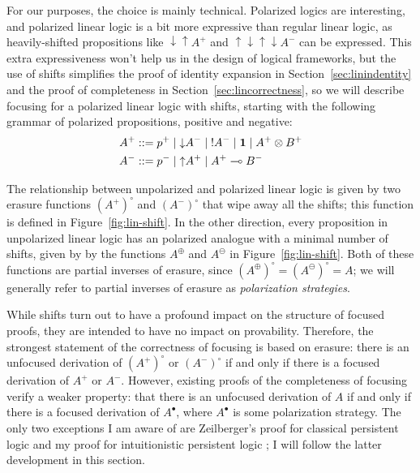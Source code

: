 For our purposes, the choice is mainly technical.  Polarized logics
are interesting, and polarized linear logic is a bit more expressive
than regular linear logic, as heavily-shifted propositions like
${\downarrow}{\uparrow}A^+$ and
${\uparrow}{\downarrow}{\uparrow}{\downarrow}A^-$ can be
expressed. This extra expressiveness won't help us in the design of
logical frameworks, but the use of shifts simplifies the proof of
identity expansion in Section~\ref{sec:linindentity} and the proof of
completeness in Section~\ref{sec:lincorrectness}, so we will describe
focusing for a polarized linear logic with shifts, starting with the 
following grammar of polarized propositions, positive and negative:
\begin{align*}
A^+ & ::= p^+ \mid {\downarrow}A^- \mid {!}A^- \mid \mathbf{1} \mid A^+ \otimes B^+\\
A^- & ::= p^- \mid {\uparrow}A^+ \mid A^+ \multimap B^-
\end{align*}



The relationship between unpolarized and polarized linear logic is
given by two erasure functions $(A^+)^\circ$ and $(A^-)^\circ$ that
wipe away all the shifts; this function is defined in
Figure~\ref{fig:lin-shift}. In the other direction, every 
proposition in unpolarized linear logic has an polarized
analogue with a minimal number of shifts, given by by
the functions $A^\oplus$ and $A^\ominus$ in Figure~\ref{fig:lin-shift}.
Both of these functions are partial inverses of erasure, since
$(A^\oplus)^\circ = (A^\ominus)^\circ = A$; we will generally refer
to partial inverses of erasure as {\it polarization strategies}. 

While shifts turn out to have a profound impact on the structure of
focused proofs, they are intended to have no impact on
provability. Therefore, the strongest statement of the correctness of
focusing is based on erasure: there is an unfocused derivation of
$(A^+)^\circ$ or $(A^-)^\circ$ if and only if there is a focused
derivation of $A^+$ or $A^-$.  However, existing proofs of the
completeness of focusing verify 
a weaker property: that there is an unfocused
derivation of $A$ if and only if there is a focused derivation of
$A^\bullet$, where $A^\bullet$ is some polarization strategy.  The
only two exceptions I am aware of are Zeilberger's proof for classical
persistent logic \cite{zeilberger08unity} and my proof for
intuitionistic persistent logic \cite{simmons11structural}; I will
follow the latter development in this section.

